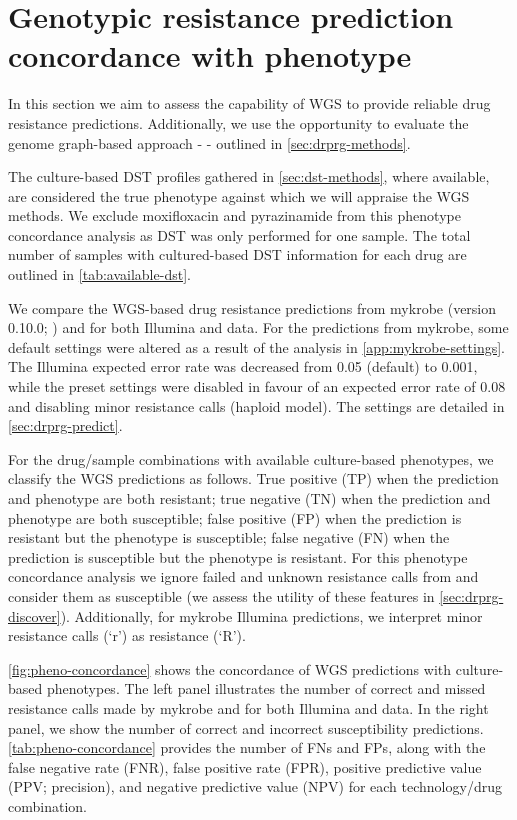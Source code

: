 \section{Genotypic resistance prediction concordance with phenotype}
\label{sec:pheno-concordance}

In this section we aim to assess the capability of \ont{} WGS to provide reliable drug resistance predictions. Additionally, we use the opportunity to evaluate the genome graph-based approach - \drprg{} - outlined in \autoref{sec:drprg-methods}.

The culture-based DST profiles gathered in \autoref{sec:dst-methods}, where available, are considered the true phenotype against which we will appraise the WGS methods. We exclude moxifloxacin and pyrazinamide from this phenotype concordance analysis as DST was only performed for one sample. The total number of samples with cultured-based DST information for each drug are outlined in \autoref{tab:available-dst}.

We compare the WGS-based drug resistance predictions from mykrobe (version 0.10.0; \cite{hunt2019}) and \drprg{} for both Illumina and \ont{} data. For the predictions from mykrobe, some default settings were altered as a result of the analysis in \autoref{app:mykrobe-settings}. The Illumina expected error rate was decreased from 0.05 (default) to 0.001, while the preset \ont{} settings were disabled in favour of an expected error rate of 0.08 and disabling minor resistance calls (haploid model). The \drprg{} settings are detailed in \autoref{sec:drprg-predict}. 

For the drug/sample combinations with available culture-based phenotypes, we classify the WGS predictions as follows. True positive (TP) when the prediction and phenotype are both resistant; true negative (TN) when the prediction and phenotype are both susceptible; false positive (FP) when the prediction is resistant but the phenotype is susceptible; false negative (FN) when the prediction is susceptible but the phenotype is resistant. For this phenotype concordance analysis we ignore failed and unknown resistance calls from \drprg{} and consider them as susceptible (we assess the utility of these features in \autoref{sec:drprg-discover}). Additionally, for mykrobe Illumina predictions, we interpret minor resistance calls (`r') as resistance (`R').

\autoref{fig:pheno-concordance} shows the concordance of WGS predictions with culture-based phenotypes. The left panel illustrates the number of correct and missed resistance calls made by mykrobe and \drprg{} for both Illumina and \ont{} data. In the right panel, we show the number of correct and incorrect susceptibility predictions. \autoref{tab:pheno-concordance} provides the number of FNs and FPs, along with the false negative rate (FNR), false positive rate (FPR), positive predictive value (PPV; precision), and negative predictive value (NPV) for each technology/drug combination. 

